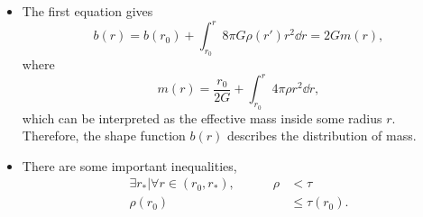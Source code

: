 \documentclass{article}
\numberwithin{equation}{section}
\begin{document}
\begin{itemize}
\begin{prooof}
    \end{prooof}
    \item The first equation gives 
    \begin{equation*}
        b(r) = b(r_0) + \int_{r_0}^r 8\pi G\rho(r')r^2 \dd{r} = 2Gm(r),
    \end{equation*}
    where 
    \begin{equation*}
        m(r) = \frac{r_0}{2G} + \int_{r_0}^{r} 4\pi \rho r^2 \dd{r},
    \end{equation*}
    which can be interpreted as the effective mass inside some radius $r.$ Therefore, the shape function $b(r)$ describes the distribution of mass.
    \item There are some important inequalities,
    \begin{align*}
        \exists r_* | \forall r\in (r_0,r_*),\quad\quad\quad \rho &< \tau \\ 
        \rho(r_0) &\le \tau(r_0).
    \end{align*}
    
\end{itemize}
\end{document}
